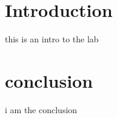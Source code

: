\documentclass{../lab-report}
\begin{document}
    

    \section{Introduction}

    this is an intro to the lab

    \pagebreak
    \section{conclusion}

    i am the conclusion
\end{document}
